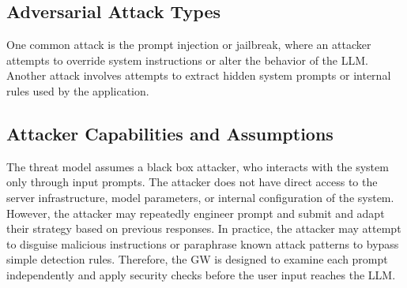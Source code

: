 \documentclass[conference]{IEEEtran}
\begin{document}

\subsection{Adversarial Attack Types}

One common attack is the prompt injection or jailbreak, where an attacker attempts to override system instructions or alter the behavior of the LLM. Another attack involves attempts to extract hidden system prompts or internal rules used by the application. %

\subsection{Attacker Capabilities and Assumptions}

The threat model assumes a black box attacker, who interacts with the system only through input prompts. The attacker does not have direct access to the server infrastructure, model parameters, or internal configuration of the system. However, the attacker may repeatedly engineer prompt and submit and adapt their strategy based on previous responses. In practice, the attacker may attempt to disguise malicious instructions or paraphrase known attack patterns to bypass simple detection rules. Therefore, the GW is designed to examine each prompt independently and apply security checks before the user input reaches the LLM.
\end{document}
